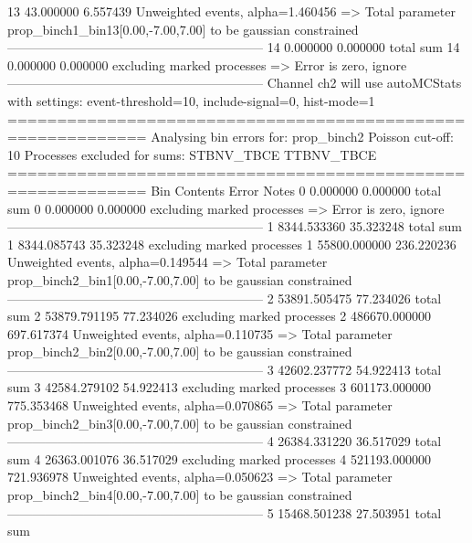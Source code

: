 13         43.000000       6.557439        Unweighted events, alpha=1.460456
  => Total parameter prop_binch1_bin13[0.00,-7.00,7.00] to be gaussian constrained
------------------------------------------------------------
14         0.000000        0.000000        total sum                     
14         0.000000        0.000000        excluding marked processes    
  => Error is zero, ignore      
------------------------------------------------------------
Channel ch2 will use autoMCStats with settings: event-threshold=10, include-signal=0, hist-mode=1
============================================================
Analysing bin errors for: prop_binch2
Poisson cut-off: 10
Processes excluded for sums: STBNV_TBCE TTBNV_TBCE
============================================================
Bin        Contents        Error           Notes                         
0          0.000000        0.000000        total sum                     
0          0.000000        0.000000        excluding marked processes    
  => Error is zero, ignore      
------------------------------------------------------------
1          8344.533360     35.323248       total sum                     
1          8344.085743     35.323248       excluding marked processes    
1          55800.000000    236.220236      Unweighted events, alpha=0.149544
  => Total parameter prop_binch2_bin1[0.00,-7.00,7.00] to be gaussian constrained
------------------------------------------------------------
2          53891.505475    77.234026       total sum                     
2          53879.791195    77.234026       excluding marked processes    
2          486670.000000   697.617374      Unweighted events, alpha=0.110735
  => Total parameter prop_binch2_bin2[0.00,-7.00,7.00] to be gaussian constrained
------------------------------------------------------------
3          42602.237772    54.922413       total sum                     
3          42584.279102    54.922413       excluding marked processes    
3          601173.000000   775.353468      Unweighted events, alpha=0.070865
  => Total parameter prop_binch2_bin3[0.00,-7.00,7.00] to be gaussian constrained
------------------------------------------------------------
4          26384.331220    36.517029       total sum                     
4          26363.001076    36.517029       excluding marked processes    
4          521193.000000   721.936978      Unweighted events, alpha=0.050623
  => Total parameter prop_binch2_bin4[0.00,-7.00,7.00] to be gaussian constrained
------------------------------------------------------------
5          15468.501238    27.503951       total sum                     
